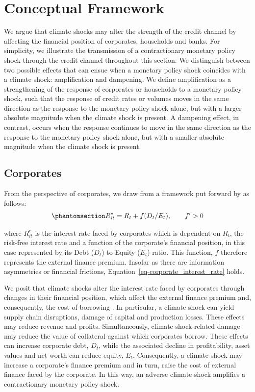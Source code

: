 \documentclass[
  letterpaper,
  DIV=11,
  numbers=noendperiod]{scrartcl}
\let\oldsection\section
\renewcommand\section{\oldsection}
\begin{document}
\section{Conceptual Framework}\label{conceptual-framework}

We argue that climate shocks may alter the strength of the credit
channel by affecting the financial position of corporates, households
and banks. For simplicity, we illustrate the transmission of a
contractionary monetary policy shock through the credit channel
throughout this section. We distinguish between two possible effects
that can ensue when a monetary policy shock coincides with a climate
shock: amplification and dampening. We define amplification as a
strengthening of the response of corporates or households to a monetary
policy shock, such that the response of credit rates or volumes moves in
the same direction as the response to the monetary policy shock alone,
but with a larger absolute magnitude when the climate shock is present.
A dampening effect, in contrast, occurs when the response continues to
move in the same direction as the response to the monetary policy shock
alone, but with a smaller absolute magnitude when the climate shock is
present.

\subsection{Corporates}\label{corporates}

From the perspective of corporates, we draw from a framework put forward
by \citet{Bean2002Financial} as follows:
\begin{equation}\phantomsection\label{eq-corporate_interest_rate}{
R_{it}^{c} = R_t + f(D_t/E_t), \qquad f' > 0
}\end{equation}

where \(R_{it}^{c}\) is the interest rate faced by corporates which is
dependent on \(R_t\), the risk-free interest rate and a function of the
corporate's financial position, in this case represented by its Debt
(\(D_t\)) to Equity (\(E_t\)) ratio. This function, \(f\) therefore
represents the external finance premium. Insofar as there are
information asymmetries or financial frictions,
Equation~\ref{eq-corporate_interest_rate} holds.

We posit that climate shocks alter the interest rate faced by corporates
through changes in their financial position, which affect the external
finance premium and, consequently, the cost of borrowing
\citep{LAUMER2025104949}. In particular, a climate shock can yield
supply chain disruptions, damage of capital and production losses. These
effects may reduce revenue and profits. Simultaneously, climate
shock-related damage may reduce the value of collateral against which
corporates borrow. These effects can increase corporate debt, \(D_t\),
while the associated decline in profitability, asset values and net
worth can reduce equity, \(E_t\). Consequently, a climate shock may
increase a corporate's finance premium and in turn, raise the cost of
external finance faced by the corporate. In this way, an adverse climate
shock amplifies a contractionary monetary policy shock.
\end{document}

